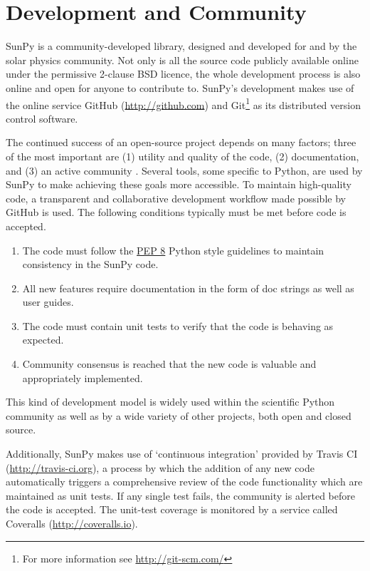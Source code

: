 \section{Development and Community}\label{sec:dev}
SunPy is a community-developed library, designed and developed for and by 
the solar physics community. Not only is all the source code publicly available 
online under the permissive 2-clause BSD licence, the whole 
development process is also online and open for anyone to contribute to.
SunPy's development makes use of the online service 
GitHub (\url{http://github.com}) and Git\footnote{For more information see \url{http://git-scm.com/}}
as its distributed version control software. 

The continued success of an open-source project depends on many factors;
three of the most important are (1) utility and quality of the code, (2) documentation, and (3) an
active community \citep{bangerth2013}. Several tools, some specific to Python, are used by
SunPy to make achieving these goals more accessible. To maintain high-quality code, a 
transparent and collaborative development workflow made possible by GitHub is used.
The following conditions typically must be met before code is accepted.
\begin{enumerate}
	\item  The code must follow the
	\href{http://www.python.org/dev/peps/pep-0008/}{PEP 8} Python style 
	guidelines to maintain consistency in the SunPy code.
	
	\item All new features require documentation in the form of doc strings as well as user
	guides. 
	
	\item The code must contain unit tests to verify that the code is behaving 
	as expected.

        \item Community consensus is reached that the new code is valuable and appropriately implemented.
\end{enumerate}
This kind of development model is widely used within the scientific Python 
community as well as by a wide variety of other projects, both open and closed 
source.

Additionally, SunPy makes use of `continuous integration' provided by Travis CI (\url{http://travis-ci.org}), a process by which the addition of any new code 
automatically triggers a comprehensive review of the code functionality which are maintained as unit tests.
 If any single test
fails, the community is alerted before the code is accepted. The unit-test coverage is monitored by
a service called Coveralls (\url{http://coveralls.io}).


